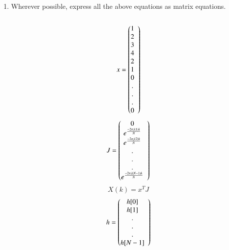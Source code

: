 \documentclass[journal,12pt,twocolumn]{IEEEtran}
\renewcommand\thesection{\arabic{section}}
\begin{document}
\begin{enumerate}[label=\thesection.\arabic*]
\item Wherever possible, express all the above equations as matrix equations.
\\

\solution \\
\[
\begin{array}{lc}
    x = 
  \left(\begin{array}{@{}ccc@{}}
    1 \\
    2 \\
    3 \\
    4 \\
    2 \\
    1 \\
    0 \\
    . \\
    . \\
    . \\
    0 \\
  \end{array}\right) \\[15pt]
\end{array}
\]
\[
\begin{array}{lc}
    J = 
  \left(\begin{array}{@{}ccc@{}}
    0 \\
    e^{\frac{-2\pi j(1)k}{N}} \\
    e^{\frac{-2\pi j(2)k}{N}} \\
    . \\
    . \\
    . \\
    e^{\frac{-2\pi j(N-1)k}{N}} \\
  \end{array}\right) \\[15pt]
\end{array}
\]
\begin{equation}
    X(k) = x^{T} J
\end{equation}
\[
\begin{array}{lc}
    h = 
  \left(\begin{array}{@{}ccc@{}}
    h[0] \\
    h[1] \\
    . \\
    . \\
    . \\
    h[N-1] \\
  \end{array}\right) \\[15pt]
\end{array}
\]
\begin{equation}

\end{equation}
\end{enumerate}
\end{document}
